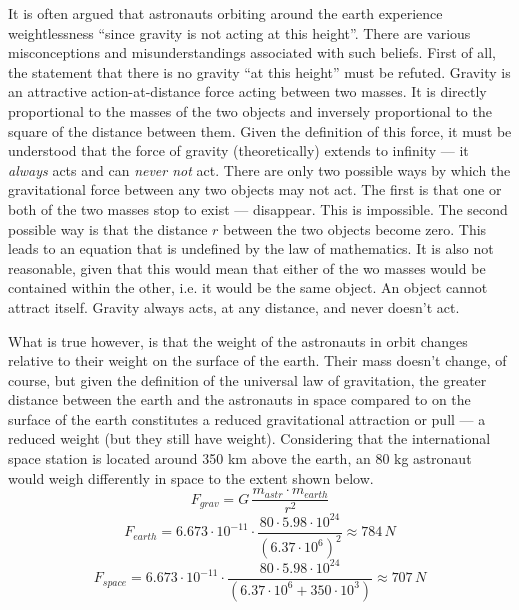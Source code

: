 
It is often argued that astronauts orbiting around the earth experience weightlessness ``since gravity is not acting at this height''. There are various misconceptions and misunderstandings associated with such beliefs. First of all, the statement that there is no gravity ``at this height'' must be refuted. Gravity is an attractive action-at-distance force acting between two masses. It is directly proportional to the masses of the two objects and inversely proportional to the square of the distance between them. Given the definition of this force, it must be understood that the force of gravity (theoretically) extends to infinity --- it \emph{always} acts and can \emph{never not} act. There are only two possible ways by which the gravitational force between any two objects may not act. The first is that one or both of the two masses stop to exist --- disappear. This is impossible. The second possible way is that the distance $r$ between the two objects become zero. This leads to an equation that is undefined by the law of mathematics. It is also not reasonable, given that this would mean that either of the wo masses would be contained within the other, i.e. it would be the same object. An object cannot attract itself. Gravity always acts, at any distance, and never doesn't act. 

What is true however, is that the weight of the astronauts in orbit changes relative to their weight on the surface of the earth. Their mass doesn't change, of course, but given the definition of the universal law of gravitation, the greater distance between the earth and the astronauts in space compared to on the surface of the earth constitutes a reduced gravitational attraction or pull --- a reduced weight (but they still have weight). Considering that the international space station is located around 350 km above the earth, an 80 kg astronaut would weigh differently in space to the extent shown below. $$F_{grav} = G \, \frac{m_{astr} \cdot m_{earth}}{r^2}$$ $$F_{earth} = 6.673 \cdot 10^{-11} \cdot \frac{80 \cdot 5.98 \cdot 10^24}{(6.37 \cdot 10^6)^2} \approx 784\, N $$ $$F_{space} = 6.673 \cdot 10^{-11} \cdot \frac{80 \cdot 5.98 \cdot 10^24}{(6.37 \cdot 10^6 + 350 \cdot 10^3)} \approx 707\, N$$

\pagebreak

